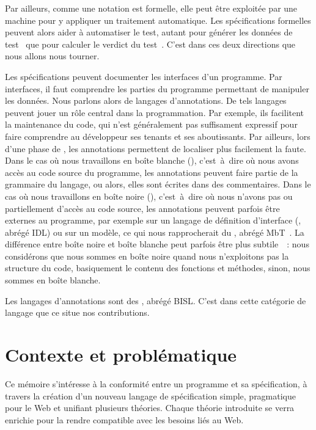 Par ailleurs, comme une notation est formelle, elle peut être exploitée par une
machine pour y appliquer un traitement automatique. Les spécifications
formelles peuvent alors aider à {\strong automatiser le test}, autant pour
générer les données de test~
que pour calculer le verdict du test~. C'est dans ces deux
directions que nous allons nous tourner.

Les spécifications peuvent documenter les {\strong interfaces} d'un programme.
Par interfaces, il faut comprendre les parties du programme permettant de
manipuler les données. Nous parlons alors de {\strong langages d'annotations}.
De tels langages peuvent jouer un rôle central dans la programmation. Par
exemple, ils facilitent la maintenance du code, qui n'est généralement pas
suffisament expressif pour faire comprendre au développeur ses tenants et ses
aboutissants. Par ailleurs, lors d'une phase de , les
annotations permettent de localiser plus facilement la faute. Dans le cas où
nous travaillons en boîte blanche (), c'est~à~dire où nous
avons accès au code source du programme, les annotations peuvent faire partie de
la grammaire du langage, ou alors, elles sont écrites dans des {\strong
commentaires}. Dans le cas où nous travaillons en boîte noire
(), c'est~à~dire où nous n'avons pas ou partiellement
d'accès au code source, les annotations peuvent parfois être externes au
programme, par exemple sur un langage de définition d'interface
(, abrégé IDL) ou sur un modèle, ce qui
nous rapprocherait du , abrégé
MbT~. La différence entre boîte noire et boîte blanche peut
parfois être plus subtile~~: nous considérons que nous sommes en
boîte noire quand nous n'exploitons pas la structure du code, basiquement le
contenu des fonctions et méthodes, sinon, nous sommes en boîte blanche.

Les langages d'annotations sont des , abrégé BISL. C'est dans cette catégorie de langage que
ce situe nos contributions.

\section{Contexte et problématique}

Ce mémoire s'intéresse à la conformité entre un programme et sa spécification, à
travers la création d'un nouveau langage de spécification simple, pragmatique
pour le Web et unifiant plusieurs théories. Chaque théorie introduite se verra
enrichie pour la rendre compatible avec les besoins liés au Web.


